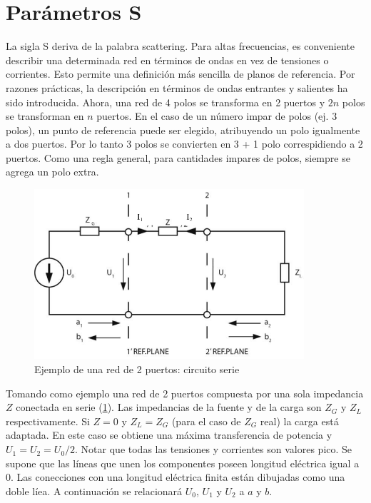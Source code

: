 \section{Parámetros S}

La sigla S deriva de la palabra scattering. Para altas frecuencias, es conveniente describir una
determinada red en términos de ondas en vez de tensiones o corrientes. Esto permite una definición más 
sencilla de planos de referencia. Por razones prácticas, la descripción en términos de ondas entrantes
y salientes ha sido introducida. Ahora, una red de 4 polos se transforma en 2 puertos y $2n$ polos se 
transforman en $n$ puertos. En el caso de un número impar de polos (ej. 3 polos), un punto de referencia
puede ser elegido, atribuyendo un polo igualmente a dos puertos. Por lo tanto 3 polos se convierten en 
3 + 1 polo correspidiendo a 2 puertos. Como una regla general, para cantidades impares de polos, siempre
se agrega un polo extra.

\begin{figure}[H]
 \centering
 \includegraphics[width=10cm]{gfx/sParameters1.png}
 \caption{Ejemplo de una red de 2 puertos: circuito serie}
 \label{fig:esquema_serie}
\end{figure}

Tomando como ejemplo una red de 2 puertos compuesta por una sola impedancia $Z$ conectada en serie (\ref{fig:esquema_serie}).
Las impedancias de la fuente y de la carga son $Z_G$ y $Z_L$ respectivamente. Si $Z=0$ y $Z_L = Z_G$ (para el caso de $Z_G$ real) 
la carga está adaptada. En este caso se obtiene una máxima transferencia de potencia y $U_1 = U_2 = U_0/2$. Notar que todas las
tensiones y corrientes son valores pico. Se supone que las líneas que unen los componentes poseen longitud eléctrica igual a 0. 
Las conecciones con una longitud eléctrica finita están dibujadas como una doble líea. A continuación se relacionará $U_0$, $U_1$ 
y $U_2$ a $a$ y $b$.


